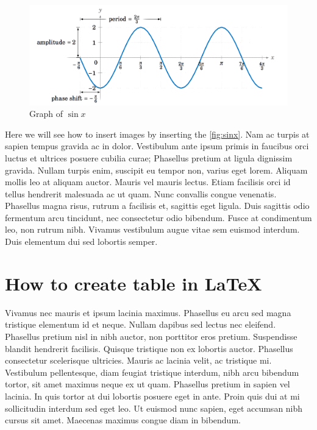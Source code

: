 \documentclass[a4paper,12pt]{article}
\begin{document}
\begin{figure}[htb!]
	\centering
	\includegraphics[scale=.5]{img/sin-graph}
	\caption{Graph of $\sin x$}
	\label{fig:sinx}
\end{figure}
Here we will see how to insert images by inserting the \autoref{fig:sinx}. 
Nam ac turpis at sapien tempus gravida ac in dolor. Vestibulum ante ipsum primis in faucibus orci luctus et ultrices posuere cubilia curae; Phasellus pretium at ligula dignissim gravida. Nullam turpis enim, suscipit eu tempor non, varius eget lorem. Aliquam mollis leo at aliquam auctor. Mauris vel mauris lectus. Etiam facilisis orci id tellus hendrerit malesuada ac ut quam. Nunc convallis congue venenatis. Phasellus magna risus, rutrum a facilisis et, sagittis eget ligula. Duis sagittis odio fermentum arcu tincidunt, nec consectetur odio bibendum. Fusce at condimentum leo, non rutrum nibh. Vivamus vestibulum augue vitae sem euismod interdum. Duis elementum dui sed lobortis semper. \cite{napster_1998}


\section{How to create table in \LaTeX}

Vivamus nec mauris et ipsum lacinia maximus. Phasellus eu arcu sed magna tristique elementum id et neque. Nullam dapibus sed lectus nec eleifend. Phasellus pretium nisl in nibh auctor, non porttitor eros pretium. Suspendisse blandit hendrerit facilisis. Quisque tristique non ex lobortis auctor. Phasellus consectetur scelerisque ultricies. Mauris ac lacinia velit, ac tristique mi. Vestibulum pellentesque, diam feugiat tristique interdum, nibh arcu bibendum tortor, sit amet maximus neque ex ut quam. Phasellus pretium in sapien vel lacinia. In quis tortor at dui lobortis posuere eget in ante. Proin quis dui at mi sollicitudin interdum sed eget leo. Ut euismod nunc sapien, eget accumsan nibh cursus sit amet. Maecenas maximus congue diam in bibendum.
\end{document}
